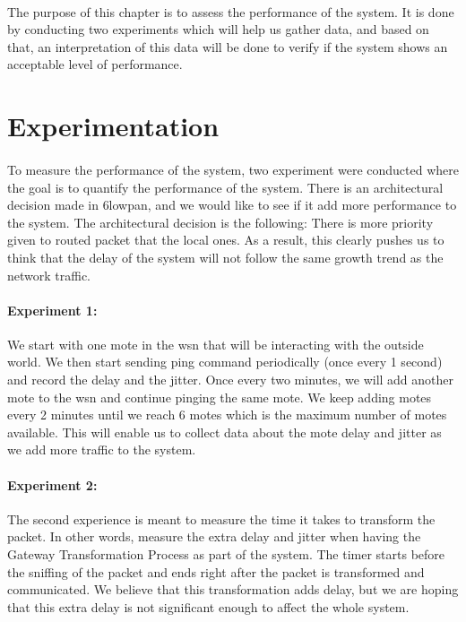 \documentclass[12pt,a4paper,final]{report}
\begin{document}
\paragraph{}
The purpose of this chapter is to assess the performance of the system. It is done by conducting two experiments which will help us gather data, and based on that, an interpretation of this data will be done to verify if the system shows an acceptable level of performance.
\section{Experimentation}
\paragraph{}
To measure the performance of the system, two experiment were conducted where the goal is to quantify the performance of the system. There is an architectural decision made in \gls{6lowpan}, and we would like to see if it add more performance to the system. The architectural decision is the following: There is more priority given to routed packet that the local ones. As a result, this clearly pushes us to think that the delay of the system will not follow the same growth trend as the network traffic.
\paragraph{Experiment 1:}
We start with one mote in the \gls{wsn} that will be interacting with the outside world. We then start sending ping command periodically (once every 1 second) and record the delay and the jitter. Once every two minutes, we will add another mote to the \gls{wsn} and continue pinging the same mote. We keep adding motes every 2 minutes until we reach 6 motes which is the maximum number of motes available. This will enable us to collect data about the mote delay and jitter as we add more traffic to the system.
\paragraph{Experiment 2: }
The second experience is meant to measure the time it takes to transform the packet. In other words, measure the extra delay and jitter when having the Gateway Transformation Process as part of the system. The timer starts before the sniffing of the packet and ends right after the packet is transformed and communicated.
We believe that this transformation adds delay, but we are hoping that this extra delay is not significant enough to affect the whole system.
\end{document}
